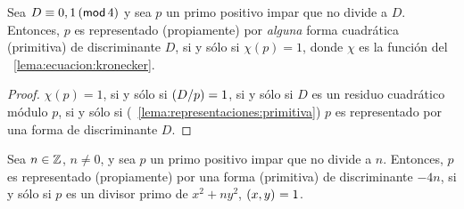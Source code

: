 \begin{teoRepresentaciones}\label{teo:representaciones}
	Sea $D\equiv 0,1\tmodulo[4]$ y sea $p$ un primo positivo impar
	que no divide a $D$. Entonces, $p$ es representado (propiamente)
	por \emph{alguna} forma cuadr\'atica (primitiva) de discriminante
	$D$, si y s\'olo si $\chi(p)=1$, donde $\chi$ es la funci\'on del
	\lemaname~\ref{lema:ecuacion:kronecker}.
\end{teoRepresentaciones}

\begin{proof}
	$\chi(p)=1$, si y s\'olo si $\tlegendre D p=1$, si y s\'olo si
	$D$ es un residuo cuadr\'atico m\'odulo $p$, si y s\'olo si
	(\lemaname~\ref{lema:representaciones:primitiva}) $p$ es
	representado por una forma de discriminante $D$.
\end{proof}

\begin{coroRepresentaciones}\label{coro:representaciones}
	Sea $n\in\Enteros$, $n\neq 0$, y sea $p$ un primo positivo
	impar que no divide a $n$. Entonces, $p$ es representado
	(propiamente) por una forma (primitiva) de discriminante $-4n$,
	si y s\'olo si $p$ es un divisor primo de $x^2+ny^2$,
	$\mcd{x,y}=1$.
\end{coroRepresentaciones}

% 


